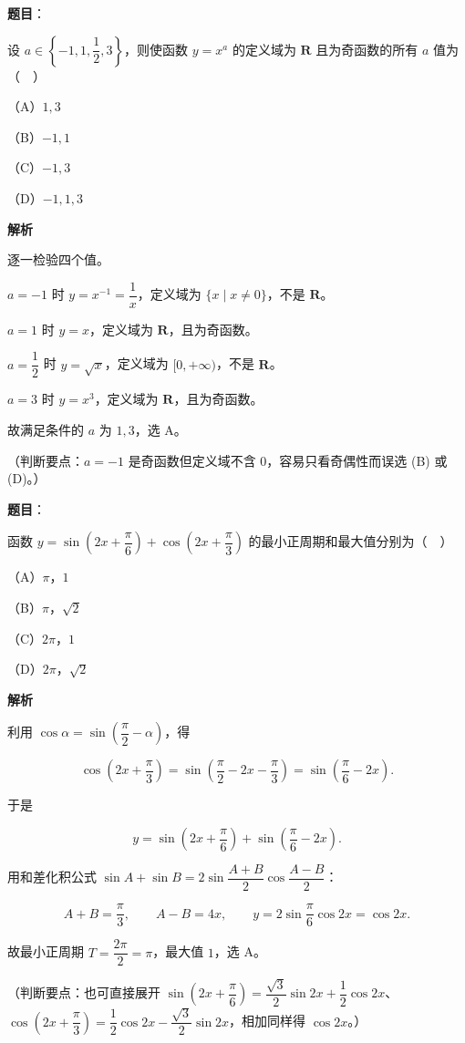 \begin{answer}

\textbf{题目}：

设 $a\in\left\{-1,1,\dfrac12,3\right\}$，则使函数 $y=x^a$ 的定义域为 $\mathbf R$ 且为奇函数的所有 $a$ 值为（　）

（A）$1,3$

（B）$-1,1$

（C）$-1,3$

（D）$-1,1,3$

\textbf{解析}

逐一检验四个值。

$a=-1$ 时 $y=x^{-1}=\dfrac1x$，定义域为 $\{x\mid x\neq0\}$，不是 $\mathbf R$。

$a=1$ 时 $y=x$，定义域为 $\mathbf R$，且为奇函数。

$a=\dfrac12$ 时 $y=\sqrt x$，定义域为 $[0,+\infty)$，不是 $\mathbf R$。

$a=3$ 时 $y=x^3$，定义域为 $\mathbf R$，且为奇函数。

故满足条件的 $a$ 为 $1,3$，选 A。

（判断要点：$a=-1$ 是奇函数但定义域不含 $0$，容易只看奇偶性而误选 (B) 或 (D)。）


\end{answer}
\begin{answer}

\textbf{题目}：

函数 $y=\sin\left(2x+\dfrac{\pi}{6}\right)+\cos\left(2x+\dfrac{\pi}{3}\right)$ 的最小正周期和最大值分别为（　）

（A）$\pi$，$1$

（B）$\pi$，$\sqrt2$

（C）$2\pi$，$1$

（D）$2\pi$，$\sqrt2$

\textbf{解析}

利用 $\cos\alpha=\sin\left(\dfrac{\pi}{2}-\alpha\right)$，得

\nopagebreak[4]
\[\cos\left(2x+\frac{\pi}{3}\right)=\sin\left(\frac{\pi}{2}-2x-\frac{\pi}{3}\right)=\sin\left(\frac{\pi}{6}-2x\right).\]

于是

\nopagebreak[4]
\[y=\sin\left(2x+\frac{\pi}{6}\right)+\sin\left(\frac{\pi}{6}-2x\right).\]

用和差化积公式 $\sin A+\sin B=2\sin\dfrac{A+B}{2}\cos\dfrac{A-B}{2}$：

\nopagebreak[4]
\[A+B=\frac{\pi}{3},\qquad A-B=4x,\qquad y=2\sin\frac{\pi}{6}\cos2x=\cos2x.\]

故最小正周期 $T=\dfrac{2\pi}{2}=\pi$，最大值 $1$，选 A。

（判断要点：也可直接展开 $\sin\left(2x+\dfrac{\pi}{6}\right)=\dfrac{\sqrt3}{2}\sin2x+\dfrac12\cos2x$、$\cos\left(2x+\dfrac{\pi}{3}\right)=\dfrac12\cos2x-\dfrac{\sqrt3}{2}\sin2x$，相加同样得 $\cos2x$。）


\end{answer}
